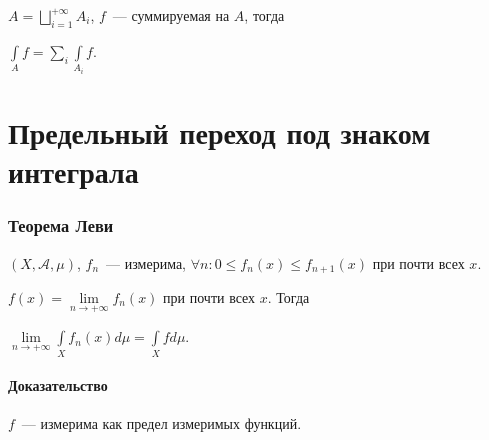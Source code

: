 \documentclass{article}
\begin{document}
            $A = \bigsqcup\limits_{i = 1}^{+\infty} A_i$, $f$~--- суммируемая на $A$, тогда 
        
            $\int\limits_{A} f = \sum\limits_{i} \int\limits_{A_i} f$.
        
\newpage

\part{Предельный переход под знаком интеграла}

\newpage

    \section{Теорема Леви}
    
        $(X, \mathcal{A}, \mu)$, $f_n$~--- измерима, $\forall n : 0 \leqslant f_n(x) \leqslant f_{n + 1} (x)$ при почти всех $x$.
        
        $f(x) = \lim\limits_{n \rightarrow +\infty} f_n(x)$ при почти всех $x$. Тогда
        
        $\lim\limits_{n \rightarrow +\infty} \int\limits_{X} f_n(x) d \mu = \int\limits_{X} f d \mu$.
        
        \subsection{Доказательство}
        
            $f$~--- измерима как предел измеримых функций.
            
\end{document}
